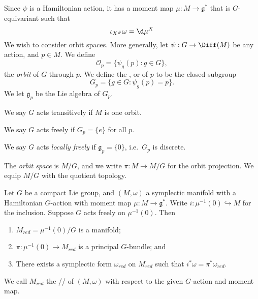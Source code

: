 \documentclass[a4paper]{article}
\begin{document}
Since $\psi$ is a Hamiltonian action, it has a moment map $\mu: M \to \mathfrak{g}^*$ that is $G$-equivariant such that
\[
  \iota_{X^\#}\omega = \d \mu^X
\]
We wish to consider orbit spaces. More generally, let $\psi: G \to \Diff(M)$ be any action, and $p \in M$. We define
\[
  \mathcal{O}_p = \{\psi_g(p) : g \in G\},
\]
the \emph{orbit} of $G$ through $p$. We define the , or  of $p$ to be the closed subgroup
\[
  G_p = \{g \in G: \psi_g(p) = p\}.
\]
We let $\mathfrak{g}_p$ be the Lie algebra of $G_p$.
\begin{defi}
  We say $G$ acts transitively if $M$ is one orbit.
\end{defi}

\begin{defi}
  We say $G$ acts freely if $G_p = \{e\}$ for all $p$.
\end{defi}

\begin{defi}
  We say $G$ acts \emph{locally freely} if $\mathfrak{g}_p = \{0\}$, i.e.\ $G_p$ is discrete.
\end{defi}

\begin{defi}
  The \emph{orbit space} is $M/G$, and we write $\pi: M \to M/G$ for the orbit projection. We equip $M/G$ with the quotient topology.
\end{defi}

\begin{thm}
  Let $G$ be a compact Lie group, and $(M, \omega)$ a symplectic manifold with a Hamiltonian $G$-action with moment map $\mu: M \to \mathfrak{g}^*$. Write $i: \mu^{-1}(0) \hookrightarrow M$ for the inclusion. Suppose $G$ acts freely on $\mu^{-1}(0)$. Then
  \begin{enumerate}
    \item $M_{red} = \mu^{-1}(0)/G$ is a manifold;
    \item $\pi: \mu^{-1}(0) \to M_{red}$ is a principal $G$-bundle; and
    \item There exists a symplectic form $\omega_{red}$ on $M_{red}$ such that $i^*\omega = \pi^* \omega_{red}$.
  \end{enumerate}
\end{thm}

\begin{defi}
  We call $M_{red}$ the // of $(M, \omega)$ with respect to the given $G$-action and moment map.
\end{defi}
\end{document}
